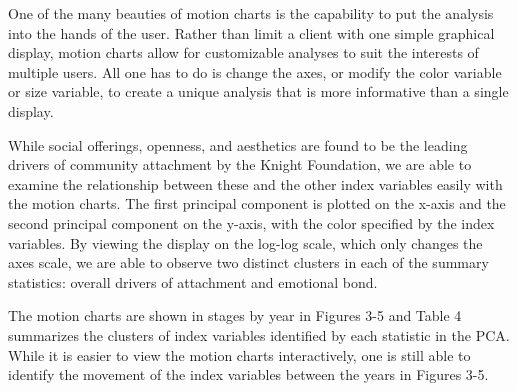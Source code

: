 \documentclass[11pt]{asaproc}
\begin{document}
One of the many beauties of motion charts is the capability to put the
analysis into the hands of the user. Rather than limit a client with
one simple graphical display, motion charts allow for customizable
analyses to suit the interests of multiple users. All one has to do is
change the axes, or modify the color variable or size variable, to
create a unique analysis that is more informative than a single display.


While social offerings, openness, and aesthetics are found to be the
leading drivers of community attachment by the Knight Foundation, we
are able to examine the relationship between these and the other index
variables easily with the motion charts. The first principal component
is plotted on the x-axis and the second principal component on the
y-axis, with the color specified by the index variables. By viewing
the display on the log-log scale, which only changes the axes scale,
we are able to observe two distinct clusters in each of the summary
statistics: overall drivers of attachment and emotional bond. 



The motion charts are shown in stages by year in Figures 3-5 and Table 4
summarizes the clusters of index variables identified by each
statistic in the PCA. While it is easier to view the motion charts
interactively, one is still able to identify the movement of the index
variables between the years in Figures 3-5. 
\end{document}
